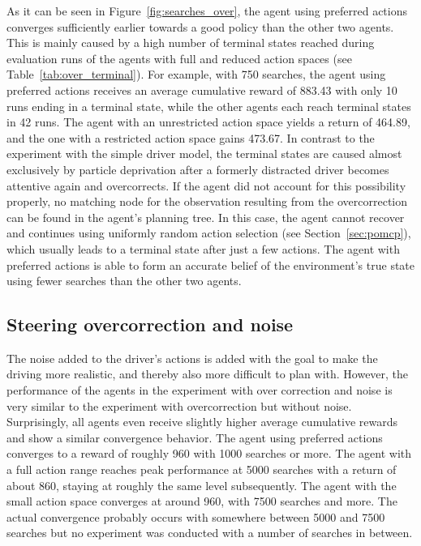   

As it can be seen in Figure~\ref{fig:searches_over}, the agent using preferred actions converges sufficiently earlier towards a good policy than the other two agents. This is mainly caused by a high number of terminal states reached during evaluation runs of the agents with full and reduced action spaces (see Table~\ref{tab:over_terminal}). For example, with 750 searches, the agent using preferred actions receives an average cumulative reward of 883.43 with only 10 runs ending in a terminal state, while the other agents each reach terminal states in 42 runs. The agent with an unrestricted action space yields a return of 464.89, and the one with a restricted action space gains 473.67. In contrast to the experiment with the simple driver model, the terminal states are caused almost exclusively by particle deprivation after a formerly distracted driver becomes attentive again and overcorrects. If the agent did not account for this possibility properly, no matching node for the observation resulting from the overcorrection can be found in the agent's planning tree. In this case, the agent cannot recover and continues using uniformly random action selection (see Section~\ref{sec:pomcp}), which usually leads to a terminal state after just a few actions. The agent with preferred actions is able to form an accurate belief of the environment's true state using fewer searches than the other two agents.


\subsection{Steering overcorrection and noise}

The noise added to the driver's actions is added with the goal to make the driving more realistic, and thereby also more difficult to plan with. However, the performance of the agents in the experiment with over correction and noise is very similar to the experiment with overcorrection but without noise. Surprisingly, all agents even receive slightly higher average cumulative rewards and show a similar convergence behavior. The agent using preferred actions converges to a reward of roughly 960 with 1000 searches or more. The agent with a full action range reaches peak performance at 5000 searches with a return of about 860, staying at roughly the same level subsequently. The agent with the small action space converges at around 960, with 7500 searches and more. The actual convergence probably occurs with somewhere between 5000 and 7500 searches but no experiment was conducted with a number of searches in between.

